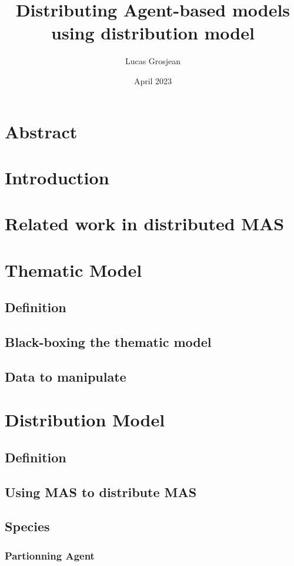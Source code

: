 \documentclass{article}
\title{Distributing Agent-based models using distribution model}
\author{Lucas Grosjean}
\date{April 2023}
\begin{document}
\maketitle
\newpage

\section{Abstract}
\hfill

\section{Introduction}
\hfill

\section{Related work in distributed MAS}
\hfill

\section{Thematic Model}
\subsection{Definition}
\subsection{Black-boxing the thematic model}
\subsection{Data to manipulate}
\hfill

\section{Distribution Model}
\subsection{Definition}
\subsection{Using MAS to distribute MAS}
\subsection{Species}
\subsubsection{Partionning Agent}
\end{document}
